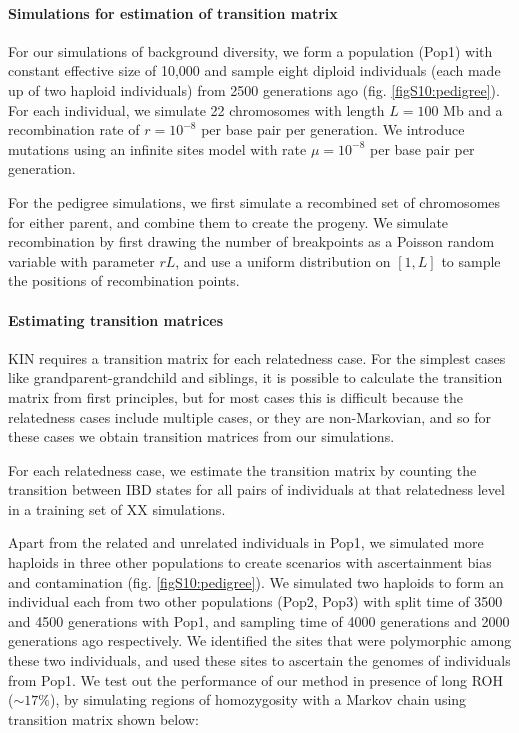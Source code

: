 \documentclass[12pt, letterpaper]{article}
\begin{document}
\paragraph{Simulations for estimation of transition matrix}

For our simulations of background diversity, we form a population (Pop1) with constant effective size of 10,000 and sample eight diploid individuals (each made up of two haploid individuals) from 2500 generations ago  (fig. \ref{figS10:pedigree}). For each individual, we simulate 22 chromosomes with length $L=100$ Mb and a recombination rate of $r=10^{-8}$ per base pair per generation. We introduce mutations using an infinite sites model with rate  $\mu= 10^{-8}$ per base pair per generation. 

For the pedigree simulations, we first simulate a recombined set of chromosomes for either parent, and combine them to create the progeny. We simulate recombination by first drawing the number of breakpoints as a  Poisson random variable with parameter $rL$, and use a uniform distribution on $[1, L]$ to sample the positions of recombination points. 

\paragraph{Estimating transition matrices}
KIN requires a transition matrix for each relatedness case. For the simplest cases like grandparent-grandchild and siblings, it is possible to calculate the transition matrix from first principles, but for most cases this is difficult  because the relatedness cases include multiple cases, or they are non-Markovian, and so for these cases we obtain transition matrices from our simulations.

For each relatedness case, we estimate the transition matrix  by counting the transition between IBD states for all pairs of individuals at that relatedness level in a training set of XX simulations.

Apart from the related and unrelated individuals in Pop1, we simulated more haploids in three other populations to create scenarios with ascertainment bias and contamination (fig. \ref{figS10:pedigree}). We simulated two haploids to form an individual each from two other populations (Pop2, Pop3) with split time of 3500 and 4500 generations with Pop1, and sampling time of 4000 generations and 2000 generations ago respectively. We identified the sites that were polymorphic among these two individuals, and used these sites to ascertain the genomes of individuals from Pop1. We test out the performance of our method in presence of long ROH ($\sim17\%$), by simulating regions of homozygosity with a Markov chain using transition matrix shown below: 
\end{document}
